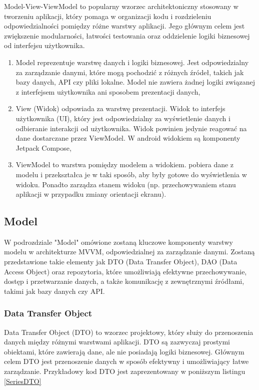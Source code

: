 \documentclass[12pt,twoside]{article}
\begin{document}
Model-View-ViewModel to popularny wzorzec architektoniczny stosowany w tworzeniu aplikacji, który pomaga w 
organizacji kodu i rozdzieleniu odpowiedzialności pomiędzy różne warstwy aplikacji. Jego głównym celem
jest zwiększenie modularności, łatwości testowania oraz oddzielenie logiki biznesowej od interfejsu użytkownika.
\begin{samepage}
\begin{enumerate}[label=\alph*), leftmargin=1.25cm]
	\item Model reprezentuje warstwę danych i logiki biznesowej. Jest odpowiedzialny za zarządzanie danymi,
	które mogą pochodzić z różnych źródeł, takich jak bazy danych, API czy pliki lokalne. Model nie zawiera
	żadnej logiki związanej z interfejsem użytkownika ani sposobem prezentacji danych,
	\item View (Widok) odpowiada za warstwę prezentacji. Widok to interfejs użytkownika (UI), który jest
	odpowiedzialny za wyświetlenie danych i odbieranie interakcji od użytkownika. Widok powinien jedynie
	reagować na dane dostarczane przez ViewModel. W android widokiem są komponenty Jetpack Compose,
	\item ViewModel to warstwa pomiędzy modelem a widokiem. pobiera dane z modelu i przekształca je
	w taki sposób, aby były gotowe do wyświetlenia w widoku. Ponadto zarządza stanem widoku (np. przechowywaniem
	stanu aplikacji w przypadku zmiany orientacji ekranu).
\end{enumerate}
\end{samepage}

\subsection{Model}
W podrozdziale "Model" omówione zostaną kluczowe komponenty warstwy modelu w architekturze MVVM, odpowiedzialnej za 
zarządzanie danymi. Zostaną przedstawione takie elementy jak DTO (Data Transfer Object), DAO (Data Access Object) 
oraz repozytoria, które umożliwiają efektywne przechowywanie, dostęp i przetwarzanie danych, a także komunikację z 
zewnętrznymi źródłami, takimi jak bazy danych czy API.

\subsubsection{Data Transfer Object}
Data Transfer Object (DTO) to wzorzec projektowy, który służy do przenoszenia danych między różnymi warstwami 
aplikacji. DTO są zazwyczaj prostymi obiektami, które zawierają dane, ale nie posiadają logiki biznesowej. Głównym 
celem DTO jest przenoszenie danych w sposób efektywny i umożliwiający łatwe zarządzanie. Przykładowy kod DTO jest 
zaprezentowany w poniższym listingu \ref{SeriesDTO}
\end{document}
